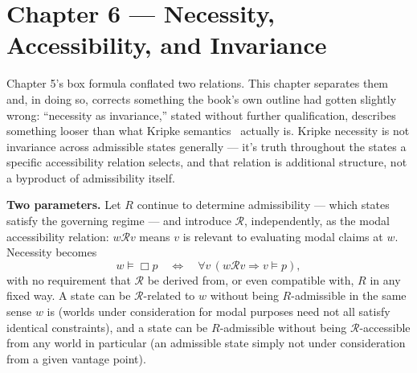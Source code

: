 \hypertarget{chapter-6-necessity-accessibility-and-invariance}{%
\chapter*{Chapter 6 --- Necessity, Accessibility, and Invariance}
\label{chapter-6-necessity-accessibility-and-invariance}}

Chapter 5's box formula conflated two relations. This chapter separates
them and, in doing so, corrects something the book's own outline had
gotten slightly wrong: ``necessity as invariance,'' stated without further
qualification, describes something looser than what Kripke semantics~\cite{kripke1963}
actually is. Kripke necessity is not invariance across admissible states
generally --- it's truth throughout the states a specific accessibility
relation selects, and that relation is additional structure, not a
byproduct of admissibility itself.

\textbf{Two parameters.} Let \(R\) continue to determine admissibility --- which
states satisfy the governing regime --- and introduce \(\mathcal{R}\),
independently, as the modal accessibility relation: \(w\mathcal{R}v\) means
\(v\) is relevant to evaluating modal claims at \(w\). Necessity becomes
\[w \models \Box p \quad\iff\quad \forall v\, (w \mathcal{R} v \Rightarrow v \models p),\]
with no requirement that \(\mathcal{R}\) be derived from, or even
compatible with, \(R\) in any fixed way. A state can be \(\mathcal{R}\)-related
to \(w\) without being \(R\)-admissible in the same sense \(w\) is (worlds
under consideration for modal purposes need not all satisfy identical
constraints), and a state can be \(R\)-admissible without being
\(\mathcal{R}\)-accessible from any world in particular (an admissible
state simply not under consideration from a given vantage point).

